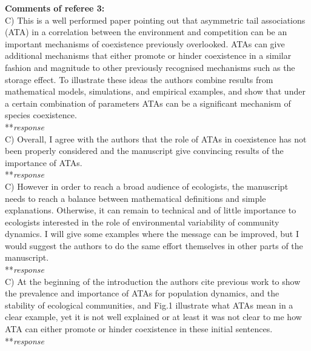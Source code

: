 \documentclass[letterpaper,11pt]{article}
\begin{document}
\noindent \textbf{Comments of referee 3:} \\

\noindent C) This is a well performed paper pointing out that asymmetric tail associations (ATA) in a correlation between the environment and competition can be an important mechanisms of coexistence previously overlooked. ATAs can give additional mechanisms that either promote or hinder coexistence in a similar fashion and magnitude to other previously recognised mechanisms such as the storage effect. To illustrate these ideas the authors combine results from mathematical models, simulations, and empirical examples, and show that under a certain combination of parameters ATAs can be a significant mechanism of species coexistence. \\

\noindent ***\emph{response} \\

\noindent C) Overall, I agree with the authors that the role of ATAs in coexistence has not been properly considered and the manuscript give convincing results of the importance of ATAs. \\

\noindent ***\emph{response} \\

\noindent C) However in order to reach a broad audience of ecologists, the manuscript needs to reach a balance between mathematical definitions and simple explanations. Otherwise, it can remain to technical and of little importance to ecologists interested in the role of environmental variability of community dynamics. I will give some examples where the message can be improved, but I would suggest the authors to do the same effort themselves in other parts of the manuscript. \\

\noindent ***\emph{response} \\

\noindent C) At the beginning of the introduction the authors cite previous work to show the prevalence and importance of ATAs for population dynamics, and the stability of ecological communities, and Fig.1 illustrate what ATAs mean in a clear example, yet it is not well explained or at least it was not clear to me how ATA can either promote or hinder coexistence in these initial sentences. \\

\noindent ***\emph{response} \\
\end{document}
